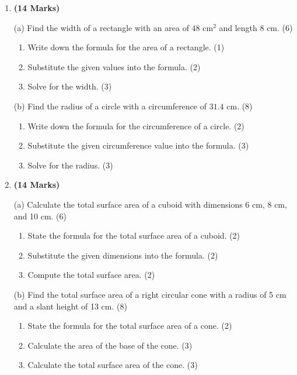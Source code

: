 \documentclass[12pt]{article}
\newenvironment{questionblock}[1][10]{
    \par\Needspace{#1\baselineskip}
}{
    \par
}
\begin{document}
\begin{enumerate}[start=3]
  \begin{questionblock}[15]
    \item \textbf{(14 Marks)}

    (a) Find the width of a rectangle with an area of $48 \text{ cm}^2$ and length $8 \text{ cm}$. (6)
    \begin{enumerate}[label=(\roman*)]
      \item Write down the formula for the area of a rectangle. (1)
      \item Substitute the given values into the formula. (2)
      \item Solve for the width. (3)
    \end{enumerate}

    (b) Find the radius of a circle with a circumference of $31.4 \text{ cm}$. (8)
    \begin{enumerate}[label=(\roman*)]
      \item Write down the formula for the circumference of a circle. (2)
      \item Substitute the given circumference value into the formula. (3)
      \item Solve for the radius. (3)
    \end{enumerate}
  \end{questionblock}

  \begin{questionblock}[15]
    \item \textbf{(14 Marks)}

    (a) Calculate the total surface area of a cuboid with dimensions 6 cm, 8 cm, and 10 cm. (6)
    \begin{enumerate}[label=(\roman*)]
      \item State the formula for the total surface area of a cuboid. (2)
      \item Substitute the given dimensions into the formula. (2)
      \item Compute the total surface area. (2)
    \end{enumerate}

    (b) Find the total surface area of a right circular cone with a radius of 5 cm and a slant height of 13 cm. (8)
    \begin{enumerate}[label=(\roman*)]
      \item State the formula for the total surface area of a cone. (2)
      \item Calculate the area of the base of the cone. (3)
      \item Calculate the total surface area of the cone. (3)
    \end{enumerate}
  \end{questionblock}


\end{enumerate}
\end{document}
